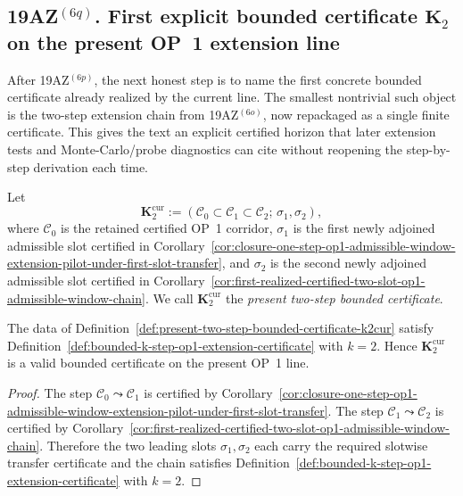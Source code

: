 \subsection*{19AZ$^{(6q)}$. First explicit bounded certificate $\mathbf K_2$ on the present OP~1 extension line}
\label{sec:first-explicit-bounded-certificate-k2-on-present-op1-extension-line}
After 19AZ$^{(6p)}$, the next honest step is to name the first concrete bounded certificate already realized by the current line. The smallest nontrivial such object is the two-step extension chain from 19AZ$^{(6o)}$, now repackaged as a single finite certificate. This gives the text an explicit certified horizon that later extension tests and Monte-Carlo/probe diagnostics can cite without reopening the step-by-step derivation each time.

\begin{definition}
\label{def:present-two-step-bounded-certificate-k2cur}
Let
\[
  \mathbf K_2^{\mathrm{cur}}:=(\mathcal C_0\subset \mathcal C_1\subset \mathcal C_2;\,\sigma_1,\sigma_2),
\]
where $\mathcal C_0$ is the retained certified OP~1 corridor, $\sigma_1$ is the first newly adjoined admissible slot certified in Corollary~\ref{cor:closure-one-step-op1-admissible-window-extension-pilot-under-first-slot-transfer}, and $\sigma_2$ is the second newly adjoined admissible slot certified in Corollary~\ref{cor:first-realized-certified-two-slot-op1-admissible-window-chain}. We call $\mathbf K_2^{\mathrm{cur}}$ the \emph{present two-step bounded certificate}.
\end{definition}

\begin{proposition}
\label{prop:current-op1-line-carries-explicit-bounded-certificate-k2cur}
The data of Definition~\ref{def:present-two-step-bounded-certificate-k2cur} satisfy Definition~\ref{def:bounded-k-step-op1-extension-certificate} with $k=2$. Hence $\mathbf K_2^{\mathrm{cur}}$ is a valid bounded certificate on the present OP~1 line.
\end{proposition}

\begin{proof}
The step $\mathcal C_0\leadsto\mathcal C_1$ is certified by Corollary~\ref{cor:closure-one-step-op1-admissible-window-extension-pilot-under-first-slot-transfer}. The step $\mathcal C_1\leadsto\mathcal C_2$ is certified by Corollary~\ref{cor:first-realized-certified-two-slot-op1-admissible-window-chain}. Therefore the two leading slots $\sigma_1,\sigma_2$ each carry the required slotwise transfer certificate and the chain satisfies Definition~\ref{def:bounded-k-step-op1-extension-certificate} with $k=2$.
\end{proof}

